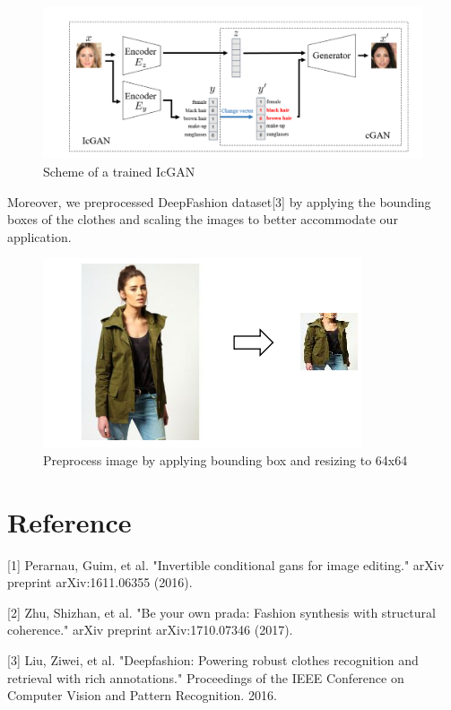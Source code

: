 \documentclass{article}
\begin{document}
\begin{figure}[h]
\centering
\includegraphics[width=0.7\linewidth]{pics/scheme.png}
\caption{Scheme of a trained IcGAN}
\label{fig:scheme}
\end{figure}

Moreover, we preprocessed DeepFashion dataset[3] by applying the bounding boxes of the clothes and scaling the images to better accommodate our application. 
  \begin{figure}[h]
  \centering
  \includegraphics[width=0.7\linewidth]{pics/preprocess.png}
  \caption{Preprocess image by applying bounding box and resizing to 64x64}
  \label{fig:preprocess}
  \end{figure}
\section{Reference}
[1] Perarnau, Guim, et al. "Invertible conditional gans for image editing." arXiv preprint arXiv:1611.06355 (2016).

[2] Zhu, Shizhan, et al. "Be your own prada: Fashion synthesis with structural coherence." arXiv preprint arXiv:1710.07346 (2017).

[3] Liu, Ziwei, et al. "Deepfashion: Powering robust clothes recognition and retrieval with rich annotations." Proceedings of the IEEE Conference on Computer Vision and Pattern Recognition. 2016.
\end{document}
